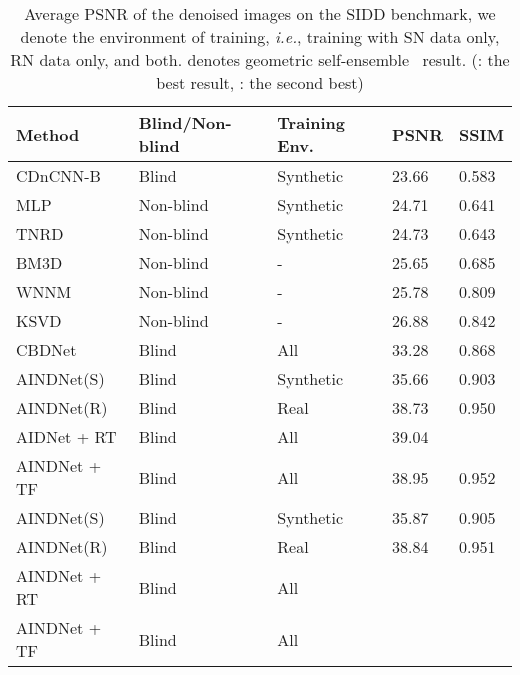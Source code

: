 \documentclass[10pt,twocolumn,letterpaper]{article}
\begin{document}
\begin{table}[t]
	\centering
	\caption{Average PSNR of the denoised images on the SIDD benchmark, we denote the environment of training, {\em i.e.}, training with SN data only, RN data only, and both.  denotes geometric self-ensemble~\cite{timofte2016seven} result. (\color{red}{red}: \color{black} the best result, \color{blue}{blue}: \color{black} the second best)}
	\label{talbe:SIDD}
	\begin{adjustbox}{width=0.88\linewidth}
		\begin{tabular}{lllll}
			\toprule			
			Method & Blind/Non-blind   & Training Env.   & PSNR & SSIM  \\
			\midrule
			CDnCNN-B~\cite{zhang2017beyond}         & Blind 	 & Synthetic  & 23.66      & 0.583      \\		
			MLP~\cite{burger2012image}         	 & Non-blind & Synthetic  & 24.71  	  & 0.641      \\	
			TNRD~\cite{chen2016trainable}         	 & Non-blind & Synthetic  & 24.73      & 0.643      \\	
			BM3D~\cite{dabov2007color}         	 & Non-blind & -  & 25.65  	  & 0.685      \\			
			WNNM~\cite{gu2014weighted}         	 & Non-blind & -  & 25.78  	  & 0.809      \\			
			KSVD~\cite{aharon2006k}         	 & Non-blind & -  & 26.88  	  & 0.842      \\				
			CBDNet~\cite{guo2019toward}   	 & Blind 	 & All  & 33.28  	  & 0.868      \\			
			\midrule
			AINDNet(S) 	    	& Blind 	 & Synthetic  & 35.66  	  & 0.903      \\	
			AINDNet(R) 			& Blind 	 & Real  & 38.73  	  & 0.950		\\
			AIDNet + RT	 		& Blind 	 & All  & 39.04  	  & \color{red}{0.955}		\\
			AINDNet + TF		& Blind 	 & All  & 38.95  	  & 0.952 		\\
			\midrule
			AINDNet(S) 	    	 & Blind 	 & Synthetic  & 35.87  	  & 0.905 \\
			AINDNet(R)	    	 & Blind 	 & Real  & 38.84  	  & 0.951 \\
			AINDNet + RT 			 & Blind 	 & All  & \color{red}{39.15}  	  & \color{red}{0.955} \\
			AINDNet + TF 	    	 & Blind 	 & All  & \color{blue}{39.08}  	  & \color{blue}{0.953} \\
			\bottomrule						
		\end{tabular}
	\end{adjustbox}
\end{table}
\end{document}
